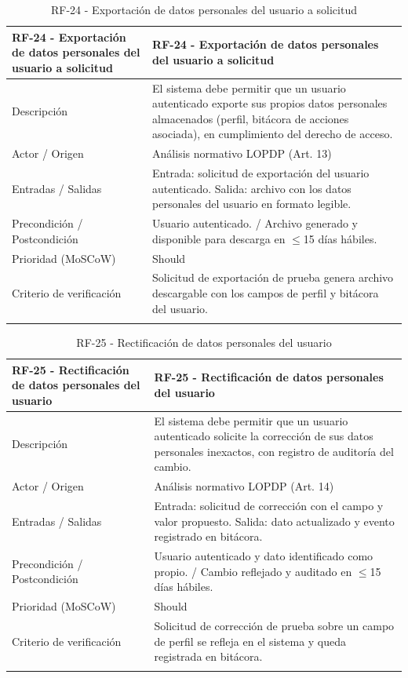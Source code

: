 \begingroup
\small
\begin{longtable}{|p{7.8cm}|p{7.8cm}|}
\hline
RF-24 - Exportación de datos personales del usuario a solicitud & RF-24 - Exportación de datos personales del usuario a solicitud \\ \hline
Descripción & El sistema debe permitir que un usuario autenticado exporte sus propios datos personales almacenados (perfil, bitácora de acciones asociada), en cumplimiento del derecho de acceso. \\ \hline
Actor / Origen & Análisis normativo LOPDP (Art. 13) \\ \hline
Entradas / Salidas & Entrada: solicitud de exportación del usuario autenticado. Salida: archivo con los datos personales del usuario en formato legible. \\ \hline
Precondición / Postcondición & Usuario autenticado. / Archivo generado y disponible para descarga en $\leq$15 días hábiles. \\ \hline
Prioridad (MoSCoW) & Should \\ \hline
Criterio de verificación & Solicitud de exportación de prueba genera archivo descargable con los campos de perfil y bitácora del usuario. \\ \hline
\caption{RF-24 - Exportación de datos personales del usuario a solicitud}
\end{longtable}
\endgroup

\begingroup
\small
\begin{longtable}{|p{7.8cm}|p{7.8cm}|}
\hline
RF-25 - Rectificación de datos personales del usuario & RF-25 - Rectificación de datos personales del usuario \\ \hline
Descripción & El sistema debe permitir que un usuario autenticado solicite la corrección de sus datos personales inexactos, con registro de auditoría del cambio. \\ \hline
Actor / Origen & Análisis normativo LOPDP (Art. 14) \\ \hline
Entradas / Salidas & Entrada: solicitud de corrección con el campo y valor propuesto. Salida: dato actualizado y evento registrado en bitácora. \\ \hline
Precondición / Postcondición & Usuario autenticado y dato identificado como propio. / Cambio reflejado y auditado en $\leq$15 días hábiles. \\ \hline
Prioridad (MoSCoW) & Should \\ \hline
Criterio de verificación & Solicitud de corrección de prueba sobre un campo de perfil se refleja en el sistema y queda registrada en bitácora. \\ \hline
\caption{RF-25 - Rectificación de datos personales del usuario}
\end{longtable}
\endgroup

